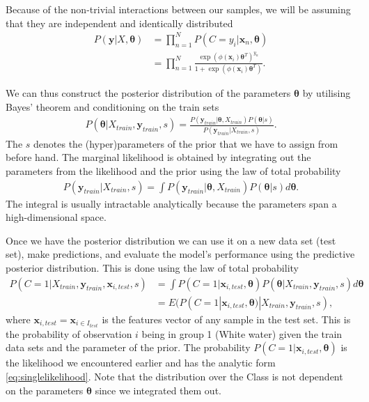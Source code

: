   Because of the non-trivial interactions between our samples, we will be assuming that they are independent and identically distributed
  \begin{align}
   P(\mathbf{y} | X, \bm{\theta}) &=\prod_{n=1}^{N} P\left(C=y_{i} | \mathbf{x}_{n}, \bm{\theta}\right) \\ 
   &=\prod_{n=1}^{N} \frac{\exp \left(\phi\left(\mathbf{x}_{i}\right)\bm{\theta}^{T} \right)^{y_{n}}}{1+\exp \left(\phi\left(\mathbf{x}_{i}\right) \bm{\theta}^{T} \right)} .
   \label{eq:likelihood}
   \end{align}
	
	We can thus construct the posterior distribution of the parameters $\bm{\theta}$ by utilising Bayes' theorem and conditioning on the train sets
	\begin{align}
	P\left(\bm{\theta}|X_{train},\mathbf{y}_{train},s\right) = \frac{	P\left(\mathbf{y}_{train}|\bm{\theta},X_{train}\right) P\left(\bm{\theta}|s\right)}{P\left(\mathbf{y}_{train}|X_{train},s\right)}.
	\end{align}
   The $s$ denotes the (hyper)parameters of the prior that we have to assign from before hand. 
   The marginal likelihood is obtained by integrating out the parameters from the likelihood and the prior using the law of total probability
   \begin{align}
   P\left(\mathbf{y}_{train}|X_{train},s\right) = \int P\left(\mathbf{y}_{train}|\bm{\theta},X_{train}\right) P\left(\bm{\theta}|s\right) d\bm{\theta}.
   \end{align}
   The integral is usually intractable analytically because the parameters span a high-dimensional space.
   
   Once we have the posterior distribution we can use it on a new data set (test set), make predictions, and evaluate the model's performance using the predictive posterior distribution. This is done using the law of total probability 
   \begin{align}
		P({C} = 1|X_{train},\mathbf{y}_{train},\mathbf{x}_{i,test},s) &= \int P(C=1|\mathbf{x}_{i,test},\bm{\theta})P(\bm{\theta}|X_{train},\mathbf{y}_{train},s) d\bm{\theta}\label{eq:classprob} \\
		&= E(P(C=1|\mathbf{x}_{i,test},\bm{\theta})|X_{train},\mathbf{y}_{train},s),
   \end{align}
   where $\mathbf{x}_{i,test}=\mathbf{x}_{i \in I_{test}} $ is the features vector of any sample in the test set.  This is the probability of observation $i$ being in group 1 (White water) given the train data sets and the parameter of the prior. The probability $P(C=1|\mathbf{x}_{i,test},\bm{\theta})$ is the likelihood we encountered earlier and has the analytic form \eqref{eq:singlelikelihood}. Note that the distribution over the Class is not dependent on the parameters $\bm{\theta}$ since we integrated them out.
   
